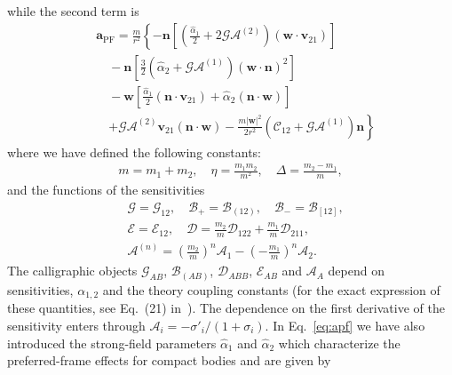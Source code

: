 \documentclass[
    floats,
    floatfix,
    amssymb,
    prd,
    twocolumn,
    superscriptaddress,
    nofootinbib,
    unicode,
    colorlinks=true,
    linktocpage=true
]{revtex4-2}
\begin{document}
%
while the second term is 
\begin{equation}
\begin{aligned}
&\mathbf{a}_{\text{PF}} = \frac{m}{r^2} \left\{ -\mathbf{n} \left[ \left( \frac{\hat{\alpha}_1}{2} + 2\mathcal{G}\mathcal{A}^{(2)} \right) (\boldsymbol{w} \cdot \mathbf{v}_{21}) \right] \right. \\
&\quad - \mathbf{n} \left[ \frac{3}{2} \left( \hat{\alpha}_2 + \mathcal{G}\mathcal{A}^{(1)} \right) (\boldsymbol{w} \cdot \mathbf{n})^2 \right]  \\
&\quad - \boldsymbol{w} \left[ \frac{\hat{\alpha}_1}{2} (\mathbf{n} \cdot \mathbf{v}_{21}) + \hat{\alpha}_2 (\mathbf{n} \cdot \boldsymbol{w}) \right] \\
&\quad \left. + \mathcal{G}\mathcal{A}^{(2)} \mathbf{v}_{21} (\mathbf{n} \cdot \boldsymbol{w}) - \frac{m |\bm{w}|^2}{2r^2} \left( \mathcal{C}_{12} + \mathcal{G}\mathcal{A}^{(1)} \right) \mathbf{n} \right\}
\end{aligned}
\label{eq:apf}
\end{equation}
where we have defined the following constants:
\begin{align}
m=m_1+m_2, \quad \eta=\frac{m_1m_2}{m^2},\quad \Delta=\frac{m_2-m_1}{m},
\end{align}
and the functions of the sensitivities
\begin{equation}
\begin{aligned}
&\mathcal{G}=\mathcal{G}_{12}, \quad \mathcal{B}_+=\mathcal{B}_{(12)}, \quad \mathcal{B}_-=\mathcal{B}_{[12]},\\
& \mathcal{E}=\mathcal{E}_{12},\quad \mathcal{D}=\frac{m_2}{m}\mathcal{D}_{122}+\frac{m_1}{m}\mathcal{D}_{211},\\  
& \mathcal{A}^{(n)}=\left(\frac{m_2}{m}\right)^n \mathcal{A}_1-\left(-\frac{m_1}{m}\right)^n \mathcal{A}_2.
\end{aligned}
\label{eq:calligraphic}
\end{equation}
The calligraphic objects $\mathcal{G}_{AB}$, $\mathcal{B}_{(AB)}$, $\mathcal{D}_{ABB}$, $\mathcal{E}_{AB}$ and $\mathcal{A}_A$ depend on sensitivities, $\alpha_{1,2}$ and the theory coupling constants (for the exact expression of these quantities, see Eq.~(21) in~\cite{Gupta_2021}). The dependence on the first derivative of the sensitivity enters through $\mathcal{A}_i=-\sigma'_i/(1+\sigma_i)$.
In Eq.~\eqref{eq:apf} we have also introduced the strong-field parameters $\hat{\alpha}_1$ and $\hat{\alpha}_2$ which characterize the preferred-frame effects for compact bodies and are given by
%
\end{document}
